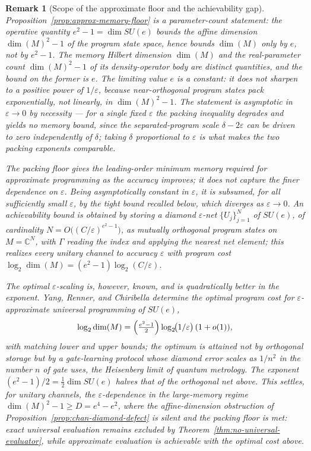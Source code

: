 \documentclass[11pt]{article}
\newtheorem{remark}[theorem]{Remark}
\begin{document}
\begin{remark}[Scope of the approximate floor and the achievability gap]
\label{rem:approx-memory-scope}
Proposition~\ref{prop:approx-memory-floor} is a parameter-count statement: the
operative quantity $e^2-1=\dim SU(e)$ bounds the affine dimension
$\dim(M)^2-1$ of the program state space, hence bounds $\dim(M)$ only by $e$,
not by $e^2-1$. The memory Hilbert dimension $\dim(M)$ and the real-parameter
count $\dim(M)^2-1$ of its density-operator body are distinct quantities, and the
bound on the former is $e$. The limiting value $e$ is a constant: it does not
sharpen to a positive power of $1/\varepsilon$, because near-orthogonal program
states pack exponentially, not linearly, in $\dim(M)^2-1$. The statement is
asymptotic in $\varepsilon\to0$ by necessity --- for a single fixed
$\varepsilon$ the packing inequality degrades and yields no memory bound, since
the separated-program scale $\delta-2\varepsilon$ can be driven to zero
independently of $\delta$; taking $\delta$ proportional to $\varepsilon$ is what
makes the two packing exponents comparable.

The packing floor gives the leading-order minimum memory required for
approximate programming as the accuracy improves; it does not capture the finer
dependence on $\varepsilon$. Being asymptotically constant in $\varepsilon$, it
is subsumed, for all sufficiently small $\varepsilon$, by the tight bound
recalled below, which diverges as $\varepsilon\to0$. An achievability bound is obtained by storing a diamond
$\varepsilon$-net $\{U_j\}_{j=1}^N$ of $SU(e)$, of cardinality
$N=O\bigl((C/\varepsilon)^{e^2-1}\bigr)$, as mutually orthogonal program states
on $M=\mathbb C^{N}$, with $\Gamma$ reading the index and applying the nearest
net element; this realizes every unitary channel to accuracy $\varepsilon$ with
program cost $\log_2\dim(M)=(e^2-1)\log_2(C/\varepsilon)$.

The optimal $\varepsilon$-scaling is, however, known, and is quadratically
better in the exponent. Yang, Renner, and Chiribella
\cite{YangRennerChiribella2020} determine the optimal program cost for
$\varepsilon$-approximate universal programming of $SU(e)$,
\[
\log_2\dim(M)
=
\Bigl(\tfrac{e^2-1}{2}\Bigr)\log_2\!\bigl(1/\varepsilon\bigr)\,(1+o(1)),
\]
with matching lower and upper bounds; the optimum is attained not by orthogonal
storage but by a gate-learning protocol whose diamond error scales as $1/n^2$
in the number $n$ of gate uses, the Heisenberg limit of quantum metrology. The
exponent $(e^2-1)/2=\tfrac12\dim SU(e)$ halves that of the orthogonal net above.
This settles, for unitary channels, the $\varepsilon$-dependence in the
large-memory regime $\dim(M)^2-1\ge D=e^4-e^2$, where the affine-dimension
obstruction of Proposition~\ref{prop:chan-diamond-defect} is silent and the
packing floor is met: exact universal evaluation remains excluded by
Theorem~\ref{thm:no-universal-evaluator}, while approximate evaluation is
achievable with the optimal cost above.


\end{remark}
\end{document}
